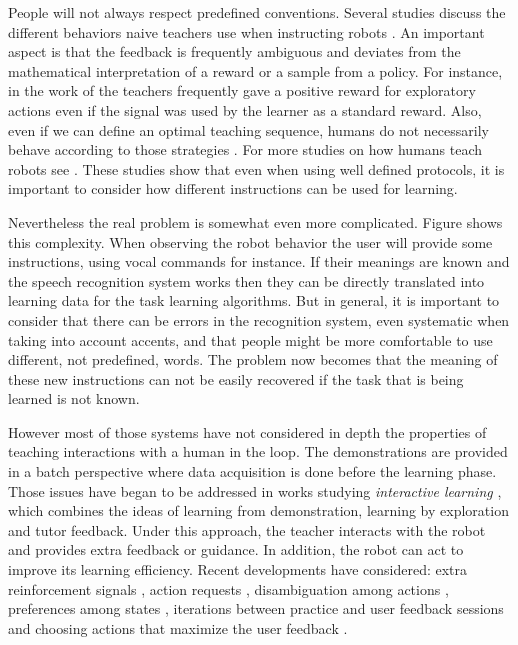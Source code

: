 People will not always respect predefined conventions. Several studies discuss the different behaviors naive teachers use when instructing robots \cite{thomaz2008teachable,Cakmak2010optimality}. An important aspect is that the feedback is frequently ambiguous and deviates from the mathematical interpretation of a reward or a sample from a policy. For instance, in the work of \cite{thomaz2008teachable} the teachers frequently gave a positive reward for exploratory actions even if the signal was used by the learner as a standard reward. Also, even if we can define an optimal teaching sequence, humans do not necessarily behave according to those strategies \cite{Cakmak2010optimality}. For more studies on how humans teach robots see \cite{thomaz2009learning,kaochar2011towards,knox2012humans}. These studies show that even when using well defined protocols, it is important to consider how different instructions can be used for learning. 

Nevertheless the real problem is somewhat even more complicated. Figure shows this complexity. When observing the robot behavior the user will provide some instructions, using vocal commands for instance. If their meanings are known and the speech recognition system works then they can be directly translated into learning data for the task learning algorithms. But in general, it is important to consider that there can be errors in the recognition system, even systematic when taking into account accents, and that people might be more comfortable to use different, not predefined, words. The problem now becomes that the meaning of these new instructions can not be easily recovered if the task that is being learned is not known.

However most of those systems have not considered in depth the properties of teaching interactions with a human in the loop. The demonstrations are provided in a batch perspective where data acquisition is done before the learning phase. Those issues have began to be addressed in works studying \textit{interactive learning} \cite{kaplan2002robotic,nicolescu2003natural,Breazeal2004,thomaz2008teachable}, which combines the ideas of learning from demonstration, learning by exploration and tutor feedback. Under this approach, the teacher interacts with the robot and provides extra feedback or guidance. In addition, the robot can act to improve its learning efficiency. Recent developments have considered: extra reinforcement signals \cite{thomaz2008teachable}, action requests \cite{macl09airl}, disambiguation among actions \cite{chernova09jair}, preferences among states \cite{Mason2011}, iterations between practice and user feedback sessions \cite{judah2010reinforcement} and choosing actions that maximize the user feedback \cite{knox2009interactively}.

